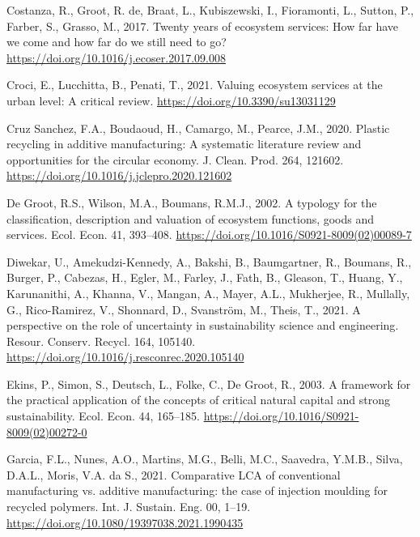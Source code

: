\documentclass[]{elsarticle} %
\newlength{\cslhangindent}
\newenvironment{CSLReferences}[2] %
 {%
  \setlength{\parindent}{0pt}
  \ifodd #1 \everypar{\setlength{\hangindent}{\cslhangindent}}\ignorespaces\fi
  \ifnum #2 > 0
  \setlength{\parskip}{#2\baselineskip}
  \fi
 }%
 {}
\begin{document}
\begin{CSLReferences}{1}{0}
\leavevmode{}%
Costanza, R., Groot, R. de, Braat, L., Kubiszewski, I., Fioramonti, L., Sutton, P., Farber, S., Grasso, M., 2017. {Twenty years of ecosystem services: How far have we come and how far do we still need to go?} \url{https://doi.org/10.1016/j.ecoser.2017.09.008}

\leavevmode{}%
Croci, E., Lucchitta, B., Penati, T., 2021. {Valuing ecosystem services at the urban level: A critical review}. \url{https://doi.org/10.3390/su13031129}

\leavevmode{}%
Cruz Sanchez, F.A., Boudaoud, H., Camargo, M., Pearce, J.M., 2020. {Plastic recycling in additive manufacturing: A systematic literature review and opportunities for the circular economy}. J. Clean. Prod. 264, 121602. \url{https://doi.org/10.1016/j.jclepro.2020.121602}

\leavevmode{}%
De Groot, R.S., Wilson, M.A., Boumans, R.M.J., 2002. {A typology for the classification, description and valuation of ecosystem functions, goods and services}. Ecol. Econ. 41, 393--408. \url{https://doi.org/10.1016/S0921-8009(02)00089-7}

\leavevmode{}%
Diwekar, U., Amekudzi-Kennedy, A., Bakshi, B., Baumgartner, R., Boumans, R., Burger, P., Cabezas, H., Egler, M., Farley, J., Fath, B., Gleason, T., Huang, Y., Karunanithi, A., Khanna, V., Mangan, A., Mayer, A.L., Mukherjee, R., Mullally, G., Rico-Ramirez, V., Shonnard, D., Svanström, M., Theis, T., 2021. {A perspective on the role of uncertainty in sustainability science and engineering}. Resour. Conserv. Recycl. 164, 105140. \url{https://doi.org/10.1016/j.resconrec.2020.105140}

\leavevmode{}%
Ekins, P., Simon, S., Deutsch, L., Folke, C., De Groot, R., 2003. {A framework for the practical application of the concepts of critical natural capital and strong sustainability}. Ecol. Econ. 44, 165--185. \url{https://doi.org/10.1016/S0921-8009(02)00272-0}

\leavevmode{}%
Garcia, F.L., Nunes, A.O., Martins, M.G., Belli, M.C., Saavedra, Y.M.B., Silva, D.A.L., Moris, V.A. da S., 2021. {Comparative LCA of conventional manufacturing vs. additive manufacturing: the case of injection moulding for recycled polymers}. Int. J. Sustain. Eng. 00, 1--19. \url{https://doi.org/10.1080/19397038.2021.1990435}


\end{CSLReferences}
\end{document}
